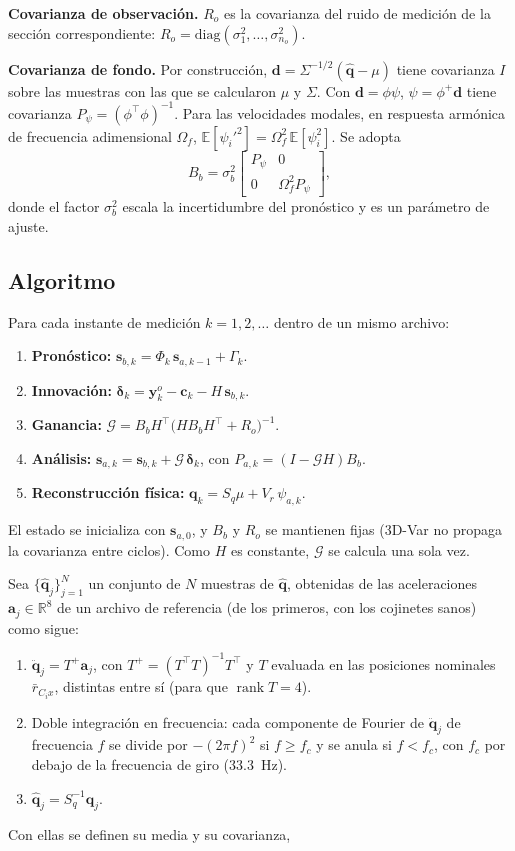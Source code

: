 \textbf{Covarianza de observación.} $R_o$ es la covarianza del ruido de medición de la sección correspondiente: 
$R_o=\mathrm{diag}(\sigma_1^2,\ldots,\sigma_{n_o}^2)$.

\textbf{Covarianza de fondo.} Por construcción, $\mathbf d=\Sigma^{-1/2}(\hat{\mathbf q}-\mu)$ tiene covarianza $I$ sobre
las muestras con las que se calcularon $\mu$ y $\Sigma$. Con $\mathbf d=\phi\psi$, $\psi=\phi^{+}\mathbf d$ tiene covarianza 
$P_\psi=(\phi^\top\phi)^{-1}$. Para las velocidades modales, en respuesta armónica de frecuencia adimensional $\Omega_f$, 
$\mathbb E[\psi_i'^2]=\Omega_f^2\,\mathbb E[\psi_i^2]$. Se adopta
\[
B_b=\sigma_b^2\begin{bmatrix}P_\psi&0\\0&\Omega_f^2P_\psi\end{bmatrix},
\]
donde el factor $\sigma_b^2$ escala la incertidumbre del pronóstico y es un parámetro de ajuste.

\subsection{Algoritmo}

Para cada instante de medición $k=1,2,\ldots$ dentro de un mismo archivo:
\begin{enumerate}
\item \textbf{Pronóstico:} $\mathbf s_{b,k}=\Phi_k\,\mathbf s_{a,k-1}+\Gamma_k$.
\item \textbf{Innovación:} $\boldsymbol\delta_k=\mathbf y^o_k-\mathbf c_k-H\,\mathbf s_{b,k}$.
\item \textbf{Ganancia:} $\mathcal G=B_bH^\top\big(HB_bH^\top+R_o\big)^{-1}$.
\item \textbf{Análisis:} $\mathbf s_{a,k}=\mathbf s_{b,k}+\mathcal G\,\boldsymbol\delta_k$, con $P_{a,k}=(I-\mathcal GH)B_b$.
\item \textbf{Reconstrucción física:} $\mathbf q_k=S_q\mu+V_r\,\psi_{a,k}$.
\end{enumerate}
El estado se inicializa con $\mathbf s_{a,0}$, y $B_b$ y $R_o$ se mantienen fijas 
(3D-Var no propaga la covarianza entre ciclos). Como $H$ es constante, $\mathcal G$ se calcula una sola vez.

Sea $\{\hat{\mathbf q}_j\}_{j=1}^N$ un conjunto de $N$ muestras de $\hat{\mathbf q}$, obtenidas de las aceleraciones
$\mathbf a_j\in\mathbb R^{8}$ de un archivo de referencia (de los primeros, con los cojinetes sanos) como sigue:
\begin{enumerate}
\item $\ddot{\mathbf q}_j=T^{+}\mathbf a_j$, con $T^{+}=(T^\top T)^{-1}T^\top$ y $T$ evaluada en las posiciones
nominales $\bar r_{C_ix}$, distintas entre sí (para que $\operatorname{rank}T=4$).
\item Doble integración en frecuencia: cada componente de Fourier de $\ddot{\mathbf q}_j$ de frecuencia $f$ se divide
por $-(2\pi f)^2$ si $f\ge f_c$ y se anula si $f<f_c$, con $f_c$ por debajo de la frecuencia de giro ($33.3$~Hz).
\item $\hat{\mathbf q}_j=S_q^{-1}\mathbf q_j$.
\end{enumerate}
Con ellas se definen su media y su covarianza,


